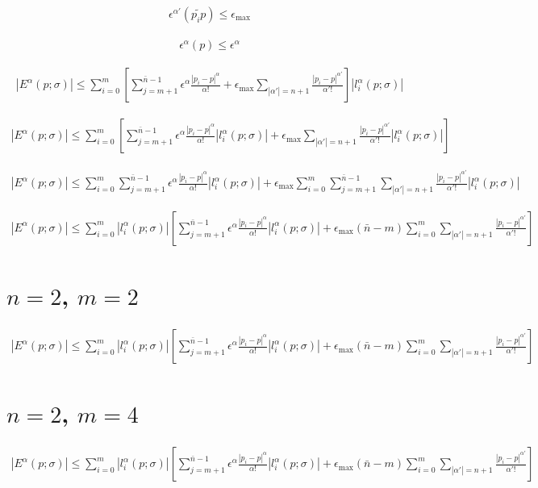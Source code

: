 \begin{align}
\epsilon^{\alpha'}(\tilde{p_ip}) \le \epsilon_{\text{max}}
\end{align}

\begin{align}
\epsilon^{\alpha}(p) \le \epsilon^{\alpha}
\end{align}

\begin{align}
|E^{\alpha}(p; \sigma)| \le \sum_{i=0}^{m} [\sum_{j=m+1}^{\bar{n}-1} \epsilon^{\alpha}\frac{|p_i-p|^{\alpha}}{\alpha !} + \epsilon_{\text{max}}\sum_{|\alpha'| = n+1} \frac{|p_i-p|^{\alpha'}}{\alpha' !}] |l_i^{\alpha}(p; \sigma)|
\end{align}


\begin{align}
|E^{\alpha}(p; \sigma)| \le \sum_{i=0}^{m} [\sum_{j=m+1}^{\bar{n}-1} \epsilon^{\alpha}\frac{|p_i-p|^{\alpha}}{\alpha !}|l_i^{\alpha}(p; \sigma)| + \epsilon_{\text{max}}\sum_{|\alpha'| = n+1} \frac{|p_i-p|^{\alpha'}}{\alpha' !}|l_i^{\alpha}(p; \sigma)|] 
\end{align}




\begin{align}
|E^{\alpha}(p; \sigma)| \le  \sum_{i=0}^{m}\sum_{j=m+1}^{\bar{n}-1} \epsilon^{\alpha}\frac{|p_i-p|^{\alpha}}{\alpha !}|l_i^{\alpha}(p; \sigma)| + \epsilon_{\text{max}}\sum_{i=0}^{m}\sum_{j=m+1}^{\bar{n}-1}\sum_{|\alpha'| = n+1} \frac{|p_i-p|^{\alpha'}}{\alpha' !}|l_i^{\alpha}(p; \sigma)|
\end{align}




\begin{align}
|E^{\alpha}(p; \sigma)| \le \sum_{i=0}^{m}|l_i^{\alpha}(p; \sigma)|[\sum_{j=m+1}^{\bar{n}-1} \epsilon^{\alpha}\frac{|p_i-p|^{\alpha}}{\alpha !}|l_i^{\alpha}(p; \sigma)| + \epsilon_{\text{max}}(\bar{n} - m)\sum_{i=0}^{m}\sum_{|\alpha'| = n+1} \frac{|p_i-p|^{\alpha'}}{\alpha' !}]
\end{align}


\section{$n=2$, $m=2$}
\begin{align}
|E^{\alpha}(p; \sigma)| \le \sum_{i=0}^{m}|l_i^{\alpha}(p; \sigma)|[\sum_{j=m+1}^{\bar{n}-1} \epsilon^{\alpha}\frac{|p_i-p|^{\alpha}}{\alpha !}|l_i^{\alpha}(p; \sigma)| + \epsilon_{\text{max}}(\bar{n} - m)\sum_{i=0}^{m}\sum_{|\alpha'| = n+1} \frac{|p_i-p|^{\alpha'}}{\alpha' !}]
\end{align}



\section{$n=2$, $m=4$}
\begin{align}
|E^{\alpha}(p; \sigma)| \le \sum_{i=0}^{m}|l_i^{\alpha}(p; \sigma)|[\sum_{j=m+1}^{\bar{n}-1} \epsilon^{\alpha}\frac{|p_i-p|^{\alpha}}{\alpha !}|l_i^{\alpha}(p; \sigma)| + \epsilon_{\text{max}}(\bar{n} - m)\sum_{i=0}^{m}\sum_{|\alpha'| = n+1} \frac{|p_i-p|^{\alpha'}}{\alpha' !}]
\end{align}
